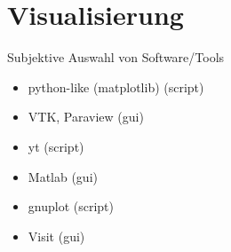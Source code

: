 \documentclass[hyperref={xetex}]{beamer}
\begin{document}
\section*{Visualisierung}

\begin{frame}{Subjektive Auswahl von Software/Tools}
  \begin{itemize}
    \item python-like (matplotlib) (script)
    \item VTK, Paraview (gui)
 \item yt (script)
 \item Matlab (gui)
 \item gnuplot (script) 
 \item Visit (gui)
  \end{itemize}
  
\end{frame}


\end{document}
